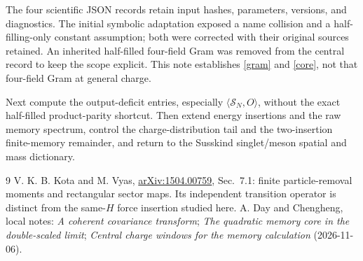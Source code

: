 \documentclass[11pt,a4paper]{article}
\begin{document}
The four scientific JSON records retain input hashes, parameters,
versions, and diagnostics. The initial symbolic adaptation exposed
a name collision and a half-filling-only constant assumption; both
were corrected with their original sources retained. An inherited
half-filled four-field Gram was removed from the central record to
keep the scope explicit. This note establishes \eqref{gram} and
\eqref{core}, not that four-field Gram at general charge.

Next compute the output-deficit entries, especially
$\langle\mathcal S_N,O\rangle$, without the exact half-filled
product-parity shortcut. Then extend energy insertions and the raw
memory spectrum, control the charge-distribution tail and the
two-insertion finite-memory remainder, and return to the Susskind
singlet/meson spatial and mass dictionary.

\begin{thebibliography}{9}\small
{} V. K. B. Kota and M. Vyas,
\href{https://arxiv.org/pdf/1504.00759}{arXiv:1504.00759},
Sec.~7.1: finite particle-removal moments and rectangular sector maps.
Its independent transition operator is distinct from the same-$H$
force insertion studied here.
 A. Day and Chengheng, local notes:
\emph{A coherent covariance transform};
\emph{The quadratic memory core in the double-scaled limit};
\emph{Central charge windows for the memory calculation} (2026-11-06).
\end{thebibliography}
\end{document}
